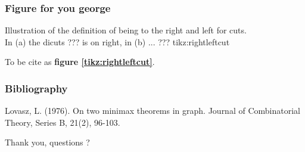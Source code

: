 \documentclass[8pt]{beamer}
\begin{document}
\iffalse
\section{Hypergraphs}
\begin{frame}
\frametitle{Definitions}
A \textit{hypergraph} H is a finite collection of finite sets. These sets are called edges and the elements of the edges are called vertices. Let $V(H)$ denote the set of vertices. If $E_1,\dots,E_m$ are the edges and $v_1,\dots,v_n$ are the vertices of H, then we define 
$$
    a_{ij}=\left\{
    \begin{array}{@{}ll@{}}
    1, & \text{if}\ v_i \in E_j \\
    0, & \text{otherwise}
    \end{array}\right.
$$

\begin{hypergraph}[Hypergraph]
If any hypergraph H' arising from H by multiplication of the vertices satisfies $v_2(H') = 2v(H')$ then $\tau(H) = v(H)$. 
\end{hypergraph}

\begin{proof}
First we show that\\
\textbf{1.} If $F$ is a collection of pairwise laminar directed cut then its incidence matrix $A$ is totally unimodular. 

\end{proof}
\end{frame}\fi

\begin{frame}
\frametitle{Figure for you george}

{Illustration of the deﬁnition of being to the right and left for cuts.\\
In (a) the dicuts ??? is on right, in (b) ... ???}
{tikz:rightleftcut}

To be cite as \textbf{figure \ref{tikz:rightleftcut}}.

\end{frame}

\begin{frame}
\frametitle{Bibliography}
Lovasz, L. (1976). On two minimax theorems in graph. Journal of Combinatorial Theory, Series B, 21(2), 96-103.
\end{frame}

{
\begin{frame}
\begin{center}
  Thank you, questions ?
\end{center}
\end{frame}
}
\end{document}
